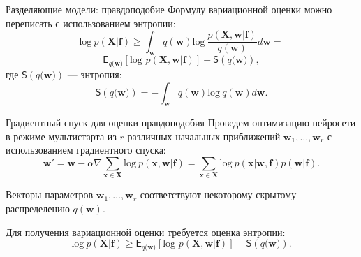 \documentclass[10pt,pdf,utf8,russian,aspectratio=169]{beamer}
\begin{document}
\begin{frame}{Разделяющие модели: правдоподобие}
Формулу вариационной оценки можно переписать с использованием энтропии:
$$\text{log}~p(\mathbf{X}|\mathbf{f}) \geq 
\int_{\mathbf{w}} q(\mathbf{w})\text{log}~\frac{p(\mathbf{X},\mathbf{w}|\mathbf{f})}{q(\mathbf{w})}d\mathbf{w} = 
$$
$$
\mathsf{E}_{q(\mathbf{w)}}[\text{log~}p (\mathbf{X}, \mathbf{w}| \mathbf{f})] - \mathsf{S}({q(\mathbf{w)}}),
$$
где $\mathsf{S}({q(\mathbf{w)}})$ --- энтропия:
$$
\mathsf{S}({q(\mathbf{w)}}) = - \int_{\mathbf{w}} q(\mathbf{w})\text{log}~q(\mathbf{w})d\mathbf{w}.  	
$$
\end{frame}

\begin{frame}{Градиентный спуск для оценки правдоподобия}
Проведем оптимизацию нейросети в режиме мультистарта из $r$ различных начальных приближений $\mathbf{w}_1, \dots, \mathbf{w}_r$ с использованием градиентного спуска:
\[
\mathbf{w}' = \mathbf{w} - \alpha  \nabla \sum_{\mathbf{x} \in \mathbf{X}} \text{log}~p(\mathbf{x},\mathbf{w}|\mathbf{f}) = \sum_{\mathbf{x} \in \mathbf{X}} \text{log}~p(\mathbf{x}|\mathbf{w}, \mathbf{f}) p(\mathbf{w}|\mathbf{f}).
\]

Векторы параметров $\mathbf{w}_1,\dots,\mathbf{w}_r$ соответствуют некоторому скрытому распределению $q(\mathbf{w})$.

Для получения вариационной оценки требуется оценка энтропии:
$$
\text{log}~p(\mathbf{X}|\mathbf{f}) \geq  \mathsf{E}_{q(\mathbf{w)}}[\text{log~}p (\mathbf{X}, \mathbf{w}| \mathbf{f})] - \mathsf{S}({q(\mathbf{w)}}).
$$


\end{frame}
\end{document}

